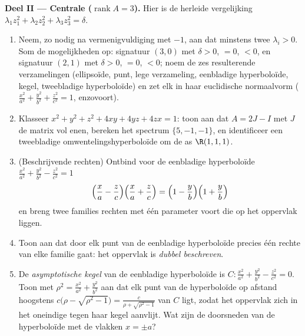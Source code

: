 \begin{problem}
\medskip
\noindent\textbf{Deel II --- Centrale 
($\operatorname{rank}A = 3$).} Hier is de herleide vergelijking
$\lambda_1z_1^2 + \lambda_2z_2^2 + \lambda_3z_3^2 = \delta$.
\begin{enumerate}[resume]
  \item Neem, zo nodig na vermenigvuldiging met $-1$, aan dat
        minstens twee $\lambda_i > 0$. Som de mogelijkheden op:
        signatuur $(3, 0)$ met $\delta > 0$, $= 0$, $< 0$, en
        signatuur $(2, 1)$ met $\delta > 0$, $= 0$, $< 0$; noem de
        zes resulterende verzamelingen (ellipsoïde, punt, lege
        verzameling, eenbladige hyperboloïde, kegel, tweebladige
        hyperboloïde) en zet elk in haar euclidische normaalvorm
        ($\frac{x^2}{a^2} + \frac{y^2}{b^2} + \frac{z^2}{c^2} =
        1$, enzovoort).
  \item Klasseer $x^2 + y^2 + z^2 + 4xy + 4yz + 4zx = 1$: toon aan
        dat $A = 2J - I$ met $J$ de matrix vol enen, bereken het
        spectrum $\{5, -1, -1\}$, en identificeer een tweebladige
        omwentelingshyperboloïde om de as $\R(1,1,1)$.
  \item (Beschrijvende rechten) Ontbind voor de eenbladige
        hyperboloïde $\frac{x^2}{a^2} + \frac{y^2}{b^2} -
        \frac{z^2}{c^2} = 1$
        \[
        \Bigl(\frac xa - \frac zc\Bigr)
        \Bigl(\frac xa + \frac zc\Bigr)
        = \Bigl(1 - \frac yb\Bigr)\Bigl(1 + \frac yb\Bigr)
        \]
        en breng twee families rechten met één parameter voort die
        op het oppervlak liggen.
  \item Toon aan dat door elk punt van de eenbladige hyperboloïde
        precies één rechte van elke familie gaat: het oppervlak is
        \emph{dubbel beschreven}.
  \item De \emph{asymptotische kegel} van de eenbladige
        hyperboloïde is $C : \frac{x^2}{a^2} + \frac{y^2}{b^2} -
        \frac{z^2}{c^2} = 0$. Toon met $\rho^2 = \frac{x^2}{a^2} +
        \frac{y^2}{b^2}$ aan dat elk punt van de hyperboloïde op
        afstand hoogstens $c\bigl(\rho - \sqrt{\rho^2 - 1}\bigr) =
        \frac{c}{\rho + \sqrt{\rho^2 - 1}}$ van $C$ ligt, zodat
        het oppervlak zich in het oneindige tegen haar kegel
        aanvlijt. Wat zijn de doorsneden van de hyperboloïde met
        de vlakken $x = \pm a$?
\end{enumerate}


\end{problem}
